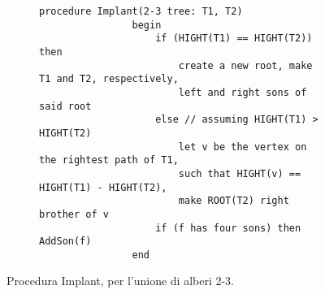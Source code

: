 \documentclass{subfiles}
\begin{document}
\begin{figure}[!h]
    \centering
    \begin{subfigure}[b]{0.85\textwidth}
        \begin{lstlisting}[language = algol]
            procedure Implant(2-3 tree: T1, T2)
                begin
                    if (HIGHT(T1) == HIGHT(T2)) then
                        create a new root, make T1 and T2, respectively,
                        left and right sons of said root
                    else // assuming HIGHT(T1) > HIGHT(T2)
                        let v be the vertex on the rightest path of T1,
                        such that HIGHT(v) == HIGHT(T1) - HIGHT(T2),
                        make ROOT(T2) right brother of v
                    if (f has four sons) then AddSon(f)
                end
            \end{lstlisting}
    \end{subfigure}
    \caption{Procedura Implant, per l'unione di alberi 2-3.}
    \label{Fig:5.2}
\end{figure}
\end{document}
